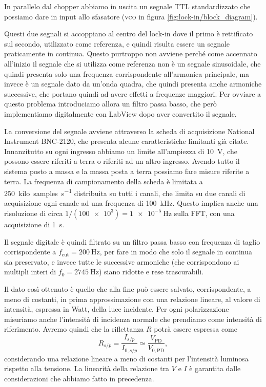 \documentclass[
    prb,altaffilletter,citeautoscript,
    amsmath,amssymb,
    showpacs,showkeys,floatfix,
    reprint
]{revtex4-1}
\begin{document}
In parallelo dal chopper abbiamo in uscita un segnale TTL standardizzato che possiamo dare in input allo sfasatore (\textsc{vco} in figura \ref{fig:lock-in/block_diagram}). 

Questi due segnali si accoppiano al centro del lock-in dove il primo è rettificato sul secondo, utilizzato come referenza, e quindi risulta essere un segnale praticamente in continua. Questo purtroppo non avviene perché come accennato all'inizio il segnale che si utilizza come referenza non è un segnale sinusoidale, che quindi presenta solo una frequenza corrispondente all'armonica principale, ma invece è un segnale dato da un'onda quadra, che quindi presenta anche armoniche successive, che portano quindi ad avere effetti a frequenze maggiori. Per ovviare a questo problema introduciamo allora un filtro passa basso, che però implementiamo digitalmente con LabView dopo aver convertito il segnale. 

La conversione del segnale avviene attraverso la scheda di acquisizione National Instrument BNC-2120, che presenta alcune caratteristiche limitanti già citate. Innanzitutto su ogni ingresso abbiamo un limite all'ampiezza di \SI{10}{\volt}, che possono essere riferiti a terra o riferiti ad un altro ingresso. Avendo tutto il sistema posto a massa e la massa posta a terra possiamo fare misure riferite a terra. La frequenza di campionamento della scheda è limitata a \SI{250}{kilo~samples\per\second} distribuita su tutti i canali, che limita su due canali di acquisizione ogni canale ad una frequenza di \SI{100}{\kilo\hertz}. Questo implica anche una risoluzione di circa $1/(\num{100e3})=\SI{1e-5}{\hertz}$ sulla FFT, con una acquisizione di \SI{1}{\second}. 

Il segnale digitale è quindi filtrato su un filtro passa basso con frequenza di taglio corrispondente a $f_\mathrm{cut}=\SI{200}{\hertz}$, per fare in modo che solo il segnale in continua sia preservato, e invece tutte le successive armoniche (che corrispondono ai multipli interi di $f_0=\SI{2745}{\hertz}$) siano ridotte e rese trascurabili. 

Il dato così ottenuto è quello che alla fine può essere salvato, corrispondente, a meno di costanti, in prima approssimazione con una relazione lineare, al valore di intensità, espressa in Watt, della luce incidente. Per ogni polarizzazione misuriamo anche l'intensità di incidenza normale che prendiamo come intensità di riferimento. Avremo quindi che la riflettanza $R$ potrà essere espressa come \begin{equation}
    R_{s/p} = \frac{I_{s/p}}{I_{0,s/p}} \simeq \frac{V_\text{PD}}{V_{0,\text{PD}}},
\end{equation} considerando una relazione lineare a meno di costanti per l'intensità luminosa rispetto alla tensione. La linearità della relazione tra $V$ e $I$ è garantita dalle considerazioni che abbiamo fatto in precedenza. 
\end{document}
